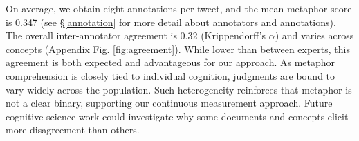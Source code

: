 On average, we obtain eight annotations per tweet, and the mean metaphor score is 0.347 (see §\ref{annotation} for more detail about annotators and annotations). The overall inter-annotator agreement is 0.32 (Krippendorff's $\alpha$) and varies across concepts (Appendix Fig. \ref{fig:agreement}). While lower than between experts, this agreement is both expected and advantageous for our approach. As metaphor comprehension is closely tied to individual cognition, judgments are bound to vary widely across the population. Such heterogeneity reinforces that metaphor is not a clear binary, supporting our continuous measurement approach. Future cognitive science work could investigate why some documents and concepts elicit more disagreement than others.

